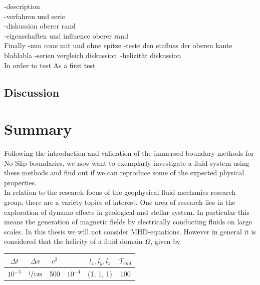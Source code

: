 -description\\
-verfahren und serie\\
-diskussion oberer rand\\
-eigenschaften und influence oberer rand \\


Finally
-nun cone mit und ohne spitze
-teste den einfluss der oberen kante blablabla
-serien vergleich diskussion\
-helizität diskussion\\

In order to test
As a first test

\subsection{Discussion}


\section{Summary}

Following the introduction and validation of the immersed boundary methods for No-Slip boundaries,
we now want to exemplarly investigate a fluid system using these methods
and find out if we can reproduce some of the expected physical properties.\\
In relation to the research focus of the geophysical fluid mechanics research group, there are a variety
topics of interest.
One area of research lies in the exploration of dynamo effects in geological and stellar system.
In particular this means the generation of magnetic fields by electrically conducting fluids on large scales.
In this thesis we will not consider MHD-equations.
However in general it is considered that the helicity of a fluid domain $\Omega$, given by

\begin{center}
\vspace*{0.7ex}
\begin{tabular}{c|c|c|c|c|c }
$\Delta t$ & $\Delta x$ & $c^2$ & \Ekman  & $l_x, l_y, l_z$ & $T_{end}$\\
\hline
$10^{-5}$ & $\nicefrac{1}{128}$ & 500 & $10^{-4}$  & (1, 1, 1) & 100\\
\end{tabular}
\vspace*{0.7ex}
\end{center}

